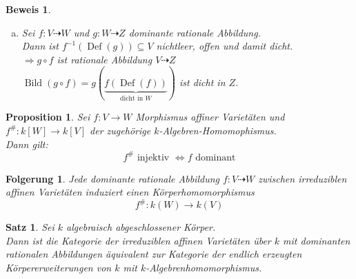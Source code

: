 \documentclass[a4paper,12pt]{report}
\theoremstyle{break}
\newtheorem{Satz}{Satz}
\newtheorem{Prop}[Def]{Proposition}
\newtheorem{Folg}[Def]{Folgerung}
\theoremstyle{nonumberbreak}
\newtheorem{Bew}{Beweis}
\theoremstyle{nonumberplain}
\DeclareMathOperator{\Ddef}{Def}%
\DeclareMathOperator{\Bild}{Bild}
\begin{document}
\begin{Bew}\begin{enumerate}[a)]
\item
	Sei $f: V\dashrightarrow W$ und $g: W\dashrightarrow Z$ dominante rationale Abbildung.\\
	Dann ist $f^{-1}(\Ddef(g))\subseteq V$ nichtleer, offen und damit dicht.\\
	$\Rightarrow g\circ f$ ist rationale Abbildung $V \dashrightarrow Z$\\
	$\Bild(g\circ f)=g(\underbrace{f(\Ddef(f))}_{\textrm{dicht in } W})$ ist dicht in $Z$.
\end{enumerate}\end{Bew}

\begin{Prop}
Sei $f:V\to W$ Morphismus affiner Variet\"aten und $f^\#:k[W]\to k[V]$ der zugeh\"orige $k$-Algebren-Homomophismus.\\
Dann gilt:
	\[ f^\# \textrm{ injektiv } \Leftrightarrow f \textrm{ dominant} \]
\end{Prop}

\begin{Folg}
Jede dominante rationale Abbildung $f:V\dashrightarrow W$ zwischen irreduziblen affinen Variet\"aten induziert einen K\"orperhomomorphismus
	\[ f^\#:k(W)\to k(V) \]
\end{Folg}

\begin{Satz}\label{satz6}
Sei $k$ algebraisch abgeschlossener K\"orper.\\
Dann ist die Kategorie der irreduziblen affinen Variet\"aten \"uber $k$ mit dominanten rationalen Abbildungen \"aquivalent zur Kategorie der endlich erzeugten K\"orpererweiterungen von $k$ mit $k$-Algebrenhomomorphismus.
\end{Satz}
\end{document}
